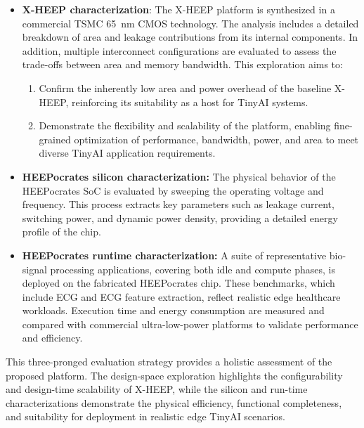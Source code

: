         \vspace{-1em}
        \begin{itemize}
            \item \textbf{X-HEEP characterization}: The \mbox{X-HEEP} platform is synthesized in a commercial \mbox{TSMC} \SI{65}{\nano\meter} CMOS technology. The analysis includes a detailed breakdown of area and leakage contributions from its internal components. In addition, multiple interconnect configurations are evaluated to assess the trade-offs between area and memory bandwidth. This exploration aims to:

            \begin{enumerate}[label=(\alph*)]
                \item Confirm the inherently low area and power overhead of the baseline \mbox{X-HEEP}, reinforcing its suitability as a host for TinyAI systems.
                \item Demonstrate the flexibility and scalability of the platform, enabling fine-grained optimization of performance, bandwidth, power, and area to meet diverse TinyAI application requirements.
            \end{enumerate}

            \item \textbf{HEEPocrates silicon characterization:} The physical behavior of the \mbox{HEEPocrates} SoC is evaluated by sweeping the operating voltage and frequency. This process extracts key parameters such as leakage current, switching power, and dynamic power density, providing a detailed energy profile of the chip.

            \item \textbf{HEEPocrates runtime characterization:} A suite of representative bio-signal processing applications, covering both idle and compute phases, is deployed on the fabricated \mbox{HEEPocrates} chip. These benchmarks, which include ECG and ECG feature extraction, reflect realistic edge healthcare workloads. Execution time and energy consumption are measured and compared with commercial ultra-low-power platforms to validate performance and efficiency.
        \end{itemize}
        \vspace{-1em}
        
        This three-pronged evaluation strategy provides a holistic assessment of the proposed platform. The design-space exploration highlights the configurability and design-time scalability of \mbox{X-HEEP}, while the silicon and run-time characterizations demonstrate the physical efficiency, functional completeness, and suitability for deployment in realistic edge TinyAI scenarios.

